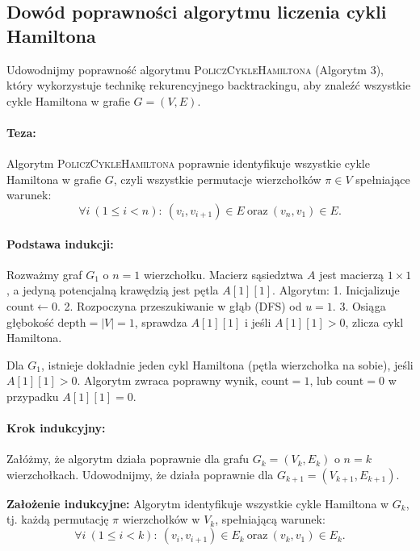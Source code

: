 \subsection{Dowód poprawności algorytmu liczenia cykli Hamiltona}

Udowodnijmy poprawność algorytmu \textsc{PoliczCykleHamiltona} (Algorytm 3), który wykorzystuje technikę rekurencyjnego backtrackingu, aby znaleźć wszystkie cykle Hamiltona w grafie \( G = (V, E) \).

\paragraph{Teza:}
Algorytm \textsc{PoliczCykleHamiltona} poprawnie identyfikuje wszystkie cykle Hamiltona w grafie \( G \), czyli wszystkie permutacje wierzchołków \( \pi \in V \) spełniające warunek:
\[
\forall i \ (1 \leq i < n): \ (v_i, v_{i+1}) \in E \ \text{oraz} \ (v_n, v_1) \in E.
\]

\paragraph{Podstawa indukcji:}
Rozważmy graf \( G_1 \) o \( n = 1 \) wierzchołku. Macierz sąsiedztwa \( A \) jest macierzą \( 1 \times 1 \), a jedyną potencjalną krawędzią jest pętla \( A[1][1] \). Algorytm:
1. Inicjalizuje \( \text{count} \gets 0 \).
2. Rozpoczyna przeszukiwanie w głąb (DFS) od \( u = 1 \).
3. Osiąga głębokość \( \text{depth} = |V| = 1 \), sprawdza \( A[1][1] \) i jeśli \( A[1][1] > 0 \), zlicza cykl Hamiltona.

Dla \( G_1 \), istnieje dokładnie jeden cykl Hamiltona (pętla wierzchołka na sobie), jeśli \( A[1][1] > 0 \). Algorytm zwraca poprawny wynik, \( \text{count} = 1 \), lub \( \text{count} = 0 \) w przypadku \( A[1][1] = 0 \).

\paragraph{Krok indukcyjny:}
Załóżmy, że algorytm działa poprawnie dla grafu \( G_k = (V_k, E_k) \) o \( n = k \) wierzchołkach. Udowodnijmy, że działa poprawnie dla \( G_{k+1} = (V_{k+1}, E_{k+1}) \).

\textbf{Założenie indukcyjne:} Algorytm identyfikuje wszystkie cykle Hamiltona w \( G_k \), tj. każdą permutację \( \pi \) wierzchołków w \( V_k \), spełniającą warunek:
\[
\forall i \ (1 \leq i < k): \ (v_i, v_{i+1}) \in E_k \ \text{oraz} \ (v_k, v_1) \in E_k.
\]

